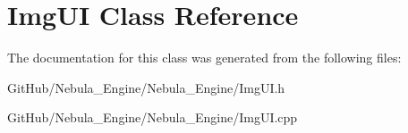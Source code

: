 \hypertarget{class_img_u_i}{}\section{Img\+UI Class Reference}
\label{class_img_u_i}


The documentation for this class was generated from the following files\+:\begin{DoxyCompactItemize}
\item 
Git\+Hub/\+Nebula\+\_\+\+Engine/\+Nebula\+\_\+\+Engine/Img\+U\+I.\+h\item 
Git\+Hub/\+Nebula\+\_\+\+Engine/\+Nebula\+\_\+\+Engine/Img\+U\+I.\+cpp\end{DoxyCompactItemize}

